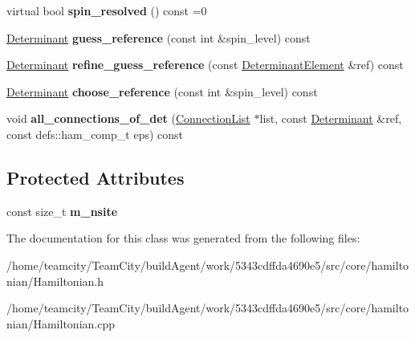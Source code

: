 \begin{DoxyCompactItemize}
\item 
virtual bool {\bfseries spin\+\_\+resolved} () const =0\hypertarget{classHamiltonian_a0499e9bce6f7adacce98cef9c0d124b1}{}\label{classHamiltonian_a0499e9bce6f7adacce98cef9c0d124b1}

\item 
\hyperlink{classDeterminant}{Determinant} {\bfseries guess\+\_\+reference} (const int \&spin\+\_\+level) const \hypertarget{classHamiltonian_a8285aa276fd0c82c0a4d5c0bfb092c01}{}\label{classHamiltonian_a8285aa276fd0c82c0a4d5c0bfb092c01}

\item 
\hyperlink{classDeterminant}{Determinant} {\bfseries refine\+\_\+guess\+\_\+reference} (const \hyperlink{classDeterminantElement}{Determinant\+Element} \&ref) const \hypertarget{classHamiltonian_a5baa86c26a113127513307fbb8507b88}{}\label{classHamiltonian_a5baa86c26a113127513307fbb8507b88}

\item 
\hyperlink{classDeterminant}{Determinant} {\bfseries choose\+\_\+reference} (const int \&spin\+\_\+level) const \hypertarget{classHamiltonian_a0fcd1d2527c37d2bd8072150b9624dfe}{}\label{classHamiltonian_a0fcd1d2527c37d2bd8072150b9624dfe}

\item 
void {\bfseries all\+\_\+connections\+\_\+of\+\_\+det} (\hyperlink{classHamiltonian_1_1ConnectionList}{Connection\+List} $\ast$list, const \hyperlink{classDeterminant}{Determinant} \&ref, const defs\+::ham\+\_\+comp\+\_\+t eps) const \hypertarget{classHamiltonian_ab2280ce8bff3fbd95a6c79200a57cda3}{}\label{classHamiltonian_ab2280ce8bff3fbd95a6c79200a57cda3}

\end{DoxyCompactItemize}
\subsection*{Protected Attributes}
\begin{DoxyCompactItemize}
\item 
const size\+\_\+t {\bfseries m\+\_\+nsite}\hypertarget{classHamiltonian_aec7c649696cbf62851f23d081fcb1e8d}{}\label{classHamiltonian_aec7c649696cbf62851f23d081fcb1e8d}

\end{DoxyCompactItemize}


The documentation for this class was generated from the following files\+:\begin{DoxyCompactItemize}
\item 
/home/teamcity/\+Team\+City/build\+Agent/work/5343cdffda4690e5/src/core/hamiltonian/Hamiltonian.\+h\item 
/home/teamcity/\+Team\+City/build\+Agent/work/5343cdffda4690e5/src/core/hamiltonian/Hamiltonian.\+cpp\end{DoxyCompactItemize}
